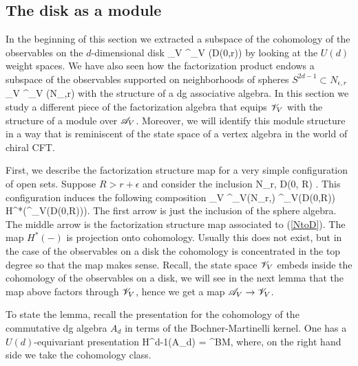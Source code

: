 \documentclass[10pt]{amsart}
\begin{document}
\subsection{The disk as a module}
In the beginning of this section we extracted a subspace of the cohomology of the observables on the $d$-dimensional disk 
\ben
\sV_V \subset \Obs^{\q}_{V} (D(0,r))
\een
by looking at the $U(d)$ weight spaces. 
We have also seen how the factorization product endows a subspace of the observables supported on neighborhoods of spheres $S^{2d-1} \subset N_{\epsilon, r}$
\ben
\sA_V \subset \Obs^\q_V (N_{\epsilon,r})
\een
with the structure of a dg associative algebra.
In this section we study a different piece of the factorization algebra that equips $\mathscr V_V$ with the structure of a module over $\mathscr A_V$. 
Moreover, we will identify this module structure in a way that is reminiscent of the state space of a vertex algebra in the world of chiral CFT.

First, we describe the factorization structure map for a very simple configuration of open sets. 
Suppose $R > r + \epsilon$ and consider the inclusion 
\be\label{NtoD}
N_{r,\epsilon} \hookrightarrow D(0, R) .
\ee
This configuration induces the following composition
\be\label{composition1}
\sA_V \hookrightarrow \Obs^\q_V(N_{r,\epsilon}) \to \Obs^\q_V(D(0,R))  H^*\left(\Obs^\q_V(D(0,R))\right).
\ee
The first arrow is just the inclusion of the sphere algebra.
The middle arrow is the factorization structure map associated to (\ref{NtoD}).
The map $H^*(-)$ is projection onto cohomology.
Usually this does not exist, but in the case of the observables on a disk the cohomology is concentrated in the top degree so that the map makes sense.
Recall, the state space $\mathscr V_V$ embeds inside the cohomology of the observables on a disk, we will see in the next lemma that the map above factors through $\mathscr V_V$, hence we get a map $\mathscr A_V \to \mathscr V_V$.

To state the lemma, recall the presentation for the cohomology of the commutative dg algebra $A_d$ in terms of the Bochner-Martinelli kernel.
One has a $U(d)$-equivariant presentation
\ben
H^{d-1}(A_d) = \CC{} \omega^{BM},
\een
where, on the right hand side we take the cohomology class.
\end{document}
